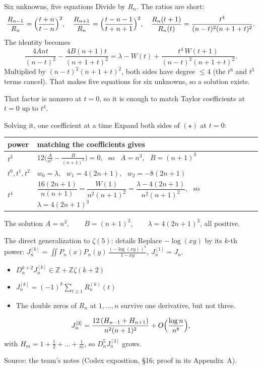 \documentclass[aspectratio=169,11pt]{beamer}
\newcommand{\Z}{\mathbb{Z}}
\newcommand{\Dn}{D_n}
\begin{document}
\begin{frame}{Six unknowns, five equations}
  Divide by $R_n$. The ratios are short:
  \[
    \frac{R_{n-1}}{R_n}=\Bigl(\frac{t+n}{t-n}\Bigr)^2,\quad
    \frac{R_{n+1}}{R_n}=\Bigl(\frac{t-n-1}{t+n+1}\Bigr)^2,\quad
    \frac{R_n(t+1)}{R_n(t)}=\frac{t^4}{(n-t)^2(n+1+t)^2}.
  \]
  The identity becomes
  \[
    \frac{4Ant}{(n-t)^2}-\frac{4B(n+1)t}{(n+1+t)^2}=\lambda-W(t)+\frac{t^4\,W(t+1)}{(n-t)^2(n+1+t)^2}.\tag{$\star$}
  \]
  Multiplied by $(n-t)^2(n+1+t)^2$, both sides have degree $\le4$ (the $t^6$ and $t^5$ terms
  cancel). That makes five equations for six unknowns, so a solution exists.
  \medskip

  That factor is nonzero at $t=0$, so it is enough to match Taylor coefficients at $t=0$ up to $t^4$.
\end{frame}

\begin{frame}{Solving it, one coefficient at a time}
  Expand both sides of $(\star)$ at $t=0$:
  \medskip

  \centering
  \begin{tabular}{@{}ll@{}}
    \toprule
    power & matching the coefficients gives\\
    \midrule
    $t^3$ & $12\bigl(\frac A{n^3}-\frac B{(n+1)^3}\bigr)=0$, \ so \ $A=n^3$, \ $B=(n+1)^3$\\[4pt]
    $t^0,t^1,t^2$ & $w_0=\lambda$, \ $w_1=4(2n+1)$, \ $w_2=-8(2n+1)$\\[4pt]
    $t^4$ & $\dfrac{16(2n+1)}{n(n+1)}=\dfrac{W(1)}{n^2(n+1)^2}=\dfrac{\lambda-4(2n+1)}{n^2(n+1)^2}$,
      \ so \ $\lambda=4(2n+1)^3$\\
    \bottomrule
  \end{tabular}
  \medskip
  \begin{block}{The solution}
    \centering
    $A=n^3,\qquad B=(n+1)^3,\qquad \lambda=4(2n+1)^3$, \qquad all positive.
  \end{block}
\end{frame}

\begin{frame}{The direct generalization to $\zeta(5)$: details}
  Replace $-\log(xy)$ by its $k$-th power:\quad
  $J_n^{[k]}=\iint P_n(x)P_n(y)\,\frac{(-\log(xy))^k}{1-xy}$, \quad $J_n^{[1]}=J_n$.
  \begin{itemize}
    \item $\Dn^{k+2}J_n^{[k]}\in\Z+\Z\zeta(k+2)$
    \item $J_n^{[k]}=(-1)^k\sum_{t\ge1}R_n^{(k)}(t)$
    \item The double zeros of $R_n$ at $1,\dots,n$ survive \alert{one} derivative,
      but not three.
  \end{itemize}
  \[
    J_n^{[3]}=\frac{12\,(H_{n-1}+H_{n+1})}{n^2(n+1)^2}+O\Bigl(\frac{\log n}{n^8}\Bigr),
  \]
  with $H_m=1+\frac12+\dots+\frac1m$, so $\Dn^5J_n^{[3]}$ grows.

  {\footnotesize Source: the team's notes (Codex exposition, \S16; proof in its Appendix~A).}
\end{frame}
\end{document}
